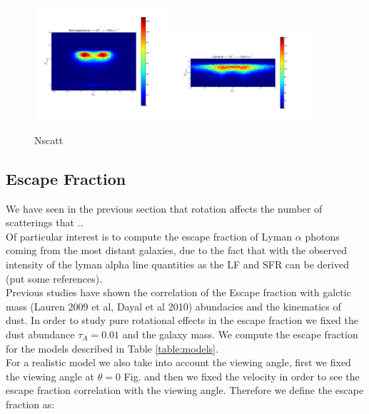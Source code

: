 \documentclass[usenatbib]{mn2e}
\begin{document}
\begin{figure}[ht]
    \includegraphics[width=0.45\textwidth]{2dHistogram50Central5t.png}
    \includegraphics[width=0.45\textwidth]{2dHistogram300Central5t.png}
\caption{Nscatt\label{fig:NscattHisto}} 
\end{figure}



\subsection{Escape Fraction}
\label{sec:EF}

We have seen in the previous section that rotation affects the number
of scatterings that ..\\

Of particular interest is to compute the escape fraction of Lyman $\alpha$ photons coming from the most distant galaxies, due to the fact that with the observed intensity of the lyman alpha line quantities as the LF and SFR can be derived (put some references). \\

Previous studies have shown the correlation of the Escape fraction with galctic mass (Lauren 2009 et al, Dayal et al 2010) abundacies and the kinematics of dust. In order to study pure rotational effects in the escape fraction we fixed the dust abundance $\tau_{A}=0.01$ and the galaxy mass. We compute the escape fraction for the models described in Table \ref{table:models}.\\

For a realistic model we also take into account the viewing angle, first we fixed the viewing angle at $\theta = 0$  Fig. and then we fixed the velocity in order to see the escape fraction correlation with the viewing angle. Therefore we define the escape fraction as:\\ 
\end{document}
